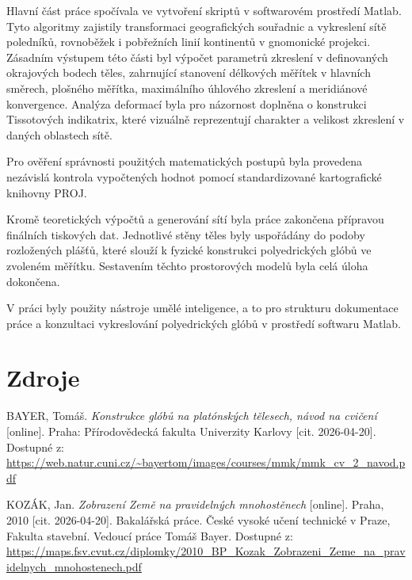 \documentclass[12pt]{article}
\begin{document}
Hlavní část práce spočívala ve vytvoření skriptů v softwarovém prostředí Matlab. Tyto algoritmy zajistily transformaci geografických souřadnic a vykreslení sítě poledníků, rovnoběžek i pobřežních linií kontinentů v gnomonické projekci. Zásadním výstupem této části byl výpočet parametrů zkreslení v definovaných okrajových bodech těles, zahrnující stanovení délkových měřítek v hlavních směrech, plošného měřítka, maximálního úhlového zkreslení a meridiánové konvergence. Analýza deformací byla pro názornost doplněna o konstrukci Tissotových indikatrix, které vizuálně reprezentují charakter a velikost zkreslení v daných oblastech sítě.

Pro ověření správnosti použitých matematických postupů byla provedena nezávislá kontrola vypočtených hodnot pomocí standardizované kartografické knihovny PROJ. 

Kromě teoretických výpočtů a generování sítí byla práce zakončena přípravou finálních tiskových dat. Jednotlivé stěny těles byly uspořádány do podoby rozložených plášťů, které slouží k fyzické konstrukci polyedrických glóbů ve zvoleném měřítku. Sestavením těchto prostorových modelů byla celá úloha dokončena.

V práci byly použity nástroje umělé inteligence, a to pro strukturu dokumentace práce a konzultaci vykreslování polyedrických glóbů v prostředí softwaru Matlab.
\newpage

{\section {Zdroje}}
BAYER, Tomáš. \textit{Konstrukce glóbů na platónských tělesech, návod na cvičení} [online]. Praha: Přírodovědecká fakulta Univerzity Karlovy [cit. 2026-04-20]. Dostupné z: \url{https://web.natur.cuni.cz/~bayertom/images/courses/mmk/mmk_cv_2_navod.pdf}

KOZÁK, Jan. \textit{Zobrazení Země na pravidelných mnohostěnech} [online]. Praha, 2010 [cit. 2026-04-20]. Bakalářská práce. České vysoké učení technické v Praze, Fakulta stavební. Vedoucí práce Tomáš Bayer. Dostupné z: \url{https://maps.fsv.cvut.cz/diplomky/2010_BP_Kozak_Zobrazeni_Zeme_na_pravidelnych_mnohostenech.pdf}
\end{document}
